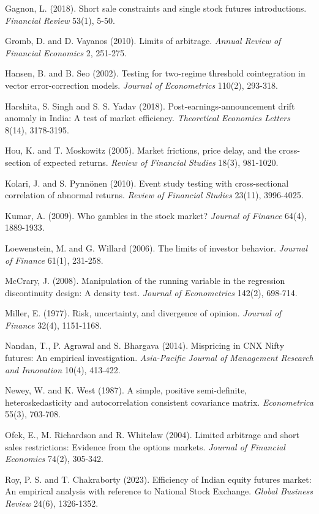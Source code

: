 \begin{description}[leftmargin=1.2em,itemsep=1pt,font=\normalfont]
\item Gagnon, L. (2018). Short sale constraints and single stock futures introductions. \emph{Financial Review} 53(1), 5-50.
\item Gromb, D. and D. Vayanos (2010). Limits of arbitrage. \emph{Annual Review of Financial Economics} 2, 251-275.
\item Hansen, B. and B. Seo (2002). Testing for two-regime threshold cointegration in vector error-correction models. \emph{Journal of Econometrics} 110(2), 293-318.
\item Harshita, S. Singh and S. S. Yadav (2018). Post-earnings-announcement drift anomaly in India: A test of market efficiency. \emph{Theoretical Economics Letters} 8(14), 3178-3195.
\item Hou, K. and T. Moskowitz (2005). Market frictions, price delay, and the cross-section of expected returns. \emph{Review of Financial Studies} 18(3), 981-1020.
\item Kolari, J. and S. Pynn\"onen (2010). Event study testing with cross-sectional correlation of abnormal returns. \emph{Review of Financial Studies} 23(11), 3996-4025.
\item Kumar, A. (2009). Who gambles in the stock market? \emph{Journal of Finance} 64(4), 1889-1933.
\item Loewenstein, M. and G. Willard (2006). The limits of investor behavior. \emph{Journal of Finance} 61(1), 231-258.
\item McCrary, J. (2008). Manipulation of the running variable in the regression discontinuity design: A density test. \emph{Journal of Econometrics} 142(2), 698-714.
\item Miller, E. (1977). Risk, uncertainty, and divergence of opinion. \emph{Journal of Finance} 32(4), 1151-1168.
\item Nandan, T., P. Agrawal and S. Bhargava (2014). Mispricing in CNX Nifty futures: An empirical investigation. \emph{Asia-Pacific Journal of Management Research and Innovation} 10(4), 413-422.
\item Newey, W. and K. West (1987). A simple, positive semi-definite, heteroskedasticity and autocorrelation consistent covariance matrix. \emph{Econometrica} 55(3), 703-708.
\item Ofek, E., M. Richardson and R. Whitelaw (2004). Limited arbitrage and short sales restrictions: Evidence from the options markets. \emph{Journal of Financial Economics} 74(2), 305-342.
\item Roy, P. S. and T. Chakraborty (2023). Efficiency of Indian equity futures market: An empirical analysis with reference to National Stock Exchange. \emph{Global Business Review} 24(6), 1326-1352.

\end{description}
